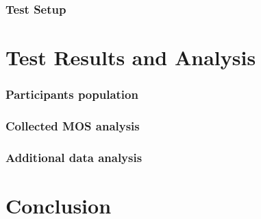 \documentclass{beamer}
\begin{document}
\begin{frame}
	\frametitle{Test Setup}
	\label{sec:test_setup}
	
\end{frame}



\section{Test Results and Analysis}
\begin{frame}
	
\end{frame}


\begin{frame}
	\frametitle{Participants population}
	\label{sec:participant_population}
	
\end{frame}


\begin{frame}
	\frametitle{Collected MOS analysis}
	\label{sec:ratings}
	
\end{frame}


\begin{frame}
	\frametitle{Additional data analysis}
	\label{sec:features}
	
\end{frame}


\section{Conclusion}

\begin{frame}
	
\end{frame}



\printbibliography
\end{document}
